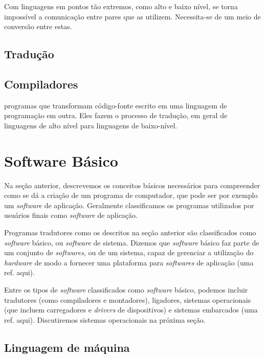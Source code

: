 Com linguagens em pontos tão extremos, como alto e baixo nível, se torna
impossível a comunicação entre pares que as utilizem. Necessita-se de um meio de
conversão entre estas.

\subsection{Tradução}




\subsection{Compiladores}

programas que transformam código-fonte escrito em uma linguagem de programação
em outra. Eles fazem o processo de tradução, em geral de linguagens de alto
nível para linguagens de baixo-nível.

\section{Software Básico}

Na seção anterior, descrevemos os conceitos básicos necessários para compreender
como se dá a criação de um programa de computador, que pode ser por exemplo um
\textit{software} de aplicação. Geralmente classificamos os programas utilizados
por usuários finais como \textit{software} de aplicação.

Programas tradutores como os descritos na seção anterior são classificados como
\textit{software} básico, ou \textit{software} de sistema. Dizemos que
\textit{software} básico faz parte de um conjunto de \textit{softwares}, ou de
um sistema, capaz de gerenciar a utilização do \textit{hardware} de modo a
fornecer uma plataforma para \textit{softwares} de aplicação (uma ref. aqui).

Entre os tipos de \textit{software} classificados como \textit{software} básico,
podemos incluir tradutores (como compiladores e montadores), ligadores, sistemas
operacionais (que incluem carregadores e \textit{drivers} de dispositivos) e
sistemas embarcados (uma ref. aqui). Discutiremos sistemas operacionais na
próxima seção.

\subsection{Linguagem de máquina}

